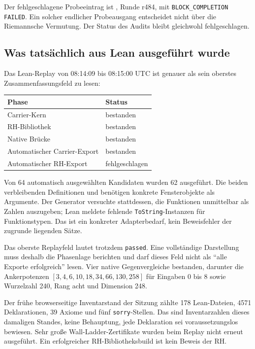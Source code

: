 Der fehlgeschlagene Probeeintrag ist , Runde r484, mit \texttt{BLOCK\_COMPLETION FAILED}. Ein solcher endlicher Probeausgang entscheidet nicht über die Riemannsche Vermutung. Der Status des Audits bleibt gleichwohl fehlgeschlagen.

\subsection{Was tatsächlich aus Lean ausgeführt wurde}
Das Lean-Replay von 08:14:09 bis 08:15:00 UTC ist genauer als sein oberstes Zusammenfassungsfeld zu lesen:
\begin{center}
\begin{tabular}{ll}
\toprule
Phase & Status\\\midrule
Carrier-Kern & bestanden\\
RH-Bibliothek & bestanden\\
Native Brücke & bestanden\\
Automatischer Carrier-Export & bestanden\\
Automatischer RH-Export & fehlgeschlagen\\\bottomrule
\end{tabular}
\end{center}
Von 64 automatisch ausgewählten Kandidaten wurden 62 ausgeführt. Die beiden verbleibenden Definitionen  und  benötigen konkrete Fensterobjekte als Argumente. Der Generator versuchte stattdessen, die Funktionen unmittelbar als Zahlen auszugeben; Lean meldete fehlende \texttt{ToString}-Instanzen für Funktionstypen. Das ist ein konkreter Adapterbedarf, kein Beweisfehler der zugrunde liegenden Sätze.

Das oberste Replayfeld lautet trotzdem \texttt{passed}. Eine vollständige Darstellung muss deshalb die Phasenlage berichten und darf dieses Feld nicht als ``alle Exporte erfolgreich'' lesen. Vier native Gegenvergleiche bestanden, darunter die Ankerpotenzen $[3,4,6,10,18,34,66,130,258]$ für Eingaben $0$ bis $8$ sowie Wurzelzahl 240, Rang acht und Dimension 248.

Der frühe browserseitige Inventarstand der Sitzung zählte 178 Lean-Dateien, 4571 Deklarationen, 39 Axiome und fünf \texttt{sorry}-Stellen. Das sind Inventarzahlen dieses damaligen Standes, keine Behauptung, jede Deklaration sei voraussetzungslos bewiesen. Sehr große Wall-Ladder-Zertifikate wurden beim Replay nicht erneut ausgeführt. Ein erfolgreicher RH-Bibliotheksbuild ist kein Beweis der RH.


